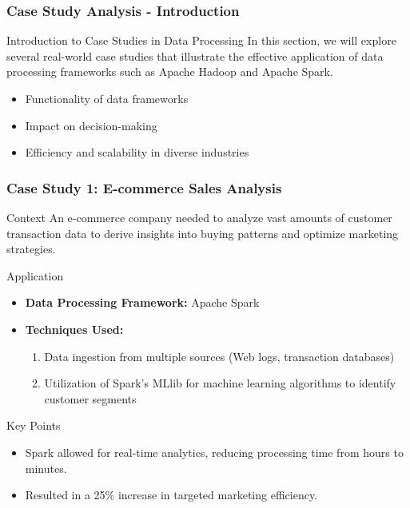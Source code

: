 \documentclass[aspectratio=169]{beamer}
\begin{document}
\begin{frame}[fragile]
    \frametitle{Case Study Analysis - Introduction}
    \begin{block}{Introduction to Case Studies in Data Processing}
        In this section, we will explore several real-world case studies that illustrate the effective application of data processing frameworks such as Apache Hadoop and Apache Spark. 
    \end{block}
    \begin{itemize}
        \item Functionality of data frameworks
        \item Impact on decision-making
        \item Efficiency and scalability in diverse industries
    \end{itemize}
\end{frame}

\begin{frame}[fragile]
    \frametitle{Case Study 1: E-commerce Sales Analysis}
    \begin{block}{Context}
        An e-commerce company needed to analyze vast amounts of customer transaction data to derive insights into buying patterns and optimize marketing strategies.
    \end{block}
    \begin{block}{Application}
        \begin{itemize}
            \item \textbf{Data Processing Framework:} Apache Spark
            \item \textbf{Techniques Used:}
            \begin{enumerate}
                \item Data ingestion from multiple sources (Web logs, transaction databases)
                \item Utilization of Spark's MLlib for machine learning algorithms to identify customer segments
            \end{enumerate}
        \end{itemize}
    \end{block}
    \begin{block}{Key Points}
        \begin{itemize}
            \item Spark allowed for real-time analytics, reducing processing time from hours to minutes.
            \item Resulted in a 25\% increase in targeted marketing efficiency.
        \end{itemize}
    \end{block}
\end{frame}
\end{document}
